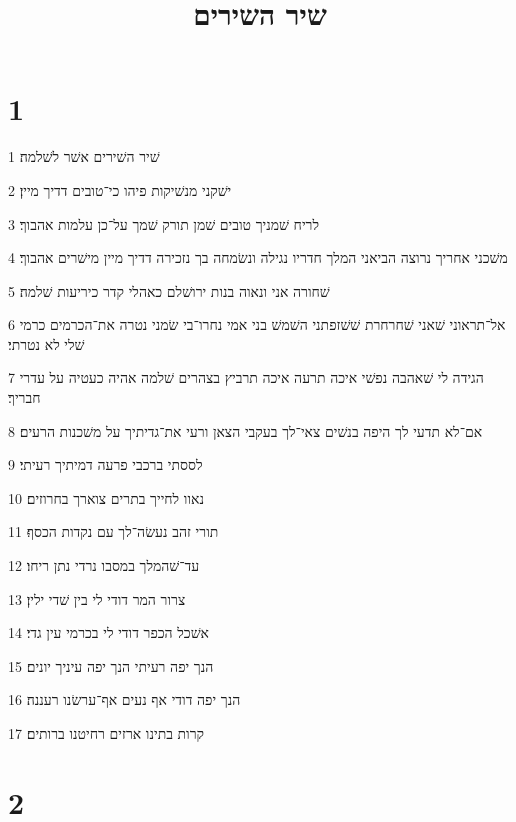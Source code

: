 

\title{שיר השירים}


\chapter{1}

\par 1 שׁיר השׁירים אשׁר לשׁלמה׃
\par 2 ישׁקני מנשׁיקות פיהו כי־טובים דדיך מיין׃
\par 3 לריח שׁמניך טובים שׁמן תורק שׁמך על־כן עלמות אהבוך׃
\par 4 משׁכני אחריך נרוצה הביאני המלך חדריו נגילה ונשׂמחה בך נזכירה דדיך מיין מישׁרים אהבוך׃
\par 5 שׁחורה אני ונאוה בנות ירושׁלם כאהלי קדר כיריעות שׁלמה׃
\par 6 אל־תראוני שׁאני שׁחרחרת שׁשׁזפתני השׁמשׁ בני אמי נחרו־בי שׂמני נטרה את־הכרמים כרמי שׁלי לא נטרתי׃
\par 7 הגידה לי שׁאהבה נפשׁי איכה תרעה איכה תרביץ בצהרים שׁלמה אהיה כעטיה על עדרי חבריך׃
\par 8 אם־לא תדעי לך היפה בנשׁים צאי־לך בעקבי הצאן ורעי את־גדיתיך על משׁכנות הרעים׃
\par 9 לססתי ברכבי פרעה דמיתיך רעיתי׃
\par 10 נאוו לחייך בתרים צוארך בחרוזים׃
\par 11 תורי זהב נעשׂה־לך עם נקדות הכסף׃
\par 12 עד־שׁהמלך במסבו נרדי נתן ריחו׃
\par 13 צרור המר דודי לי בין שׁדי ילין׃
\par 14 אשׁכל הכפר דודי לי בכרמי עין גדי׃
\par 15 הנך יפה רעיתי הנך יפה עיניך יונים׃
\par 16 הנך יפה דודי אף נעים אף־ערשׂנו רעננה׃
\par 17 קרות בתינו ארזים רחיטנו ברותים׃

\chapter{2}

